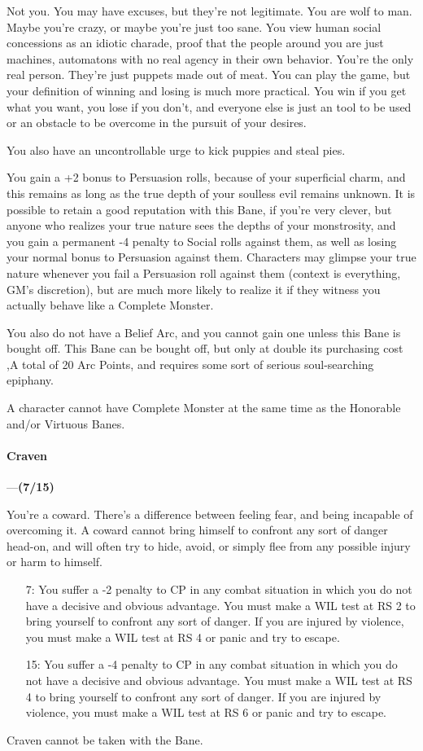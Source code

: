 \documentclass[oneside,11pt,english]{book}
\begin{document}
Not you. You may have excuses, but they're not legitimate. You are wolf to man. Maybe you're crazy, or maybe you're just too sane. You view human social concessions as an idiotic charade, proof that the 
people around you are just machines, automatons with no real agency in their own behavior. You're the 
only real person. They're just puppets made out of meat. You can play the game, but your definition of 
winning and losing is much more practical. You win if you get what you want, you lose if you don't, and 
everyone else is just an tool to be used or an obstacle to be overcome in the pursuit of your desires. 


You also have an uncontrollable urge to kick puppies and steal pies. 


You gain a +2 bonus to Persuasion rolls, because of your superficial charm, and this remains as long as 
the true depth of your soulless evil remains unknown. It is possible to retain a good reputation with this 
Bane, if you're very clever, but anyone who realizes your true nature sees the depths of your monstrosity, 
and you gain a permanent -4 penalty to Social rolls against them, as well as losing your normal bonus to 
Persuasion against them. Characters may glimpse your true nature whenever you fail a Persuasion roll 
against them (context is everything, GM's discretion), but are much more likely to realize it if they 
witness you actually behave like a Complete Monster. 


You also do not have a Belief Arc, and you cannot gain one unless this Bane is bought off. This Bane can be bought off, but only at double its purchasing cost ,A total of 20 Arc Points, and requires some sort of serious soul-searching epiphany. 


A character cannot have Complete Monster at the same time as the Honorable and/or Virtuous Banes. 
\paragraph{\label{bane:Craven}Craven}---\quad\textbf{(7/15) }\par
You're a coward. There's a difference between feeling fear, and being incapable of overcoming it. A coward cannot bring himself to confront any sort of danger head-on, and will often try to hide, avoid, or 
simply flee from any possible injury or harm to himself. 

\begin{itemize}
	\item [7:] You suffer a -2 penalty to CP in any combat situation in which you do not have a decisive and obvious advantage. You must make a WIL test at RS 2 to bring yourself to confront any sort of danger. If you are injured by violence, you must make a WIL test at RS 4 or panic and try to escape. 
	\item [15:] You suffer a -4 penalty to CP in any combat situation in which you do not have a decisive and obvious advantage. You must make a WIL test at RS 4 to bring yourself to confront any sort of danger. If you are injured by violence, you must make a WIL test at RS 6 or panic and try to escape.
\end{itemize}
Craven cannot be taken with the  Bane.
\end{document}
